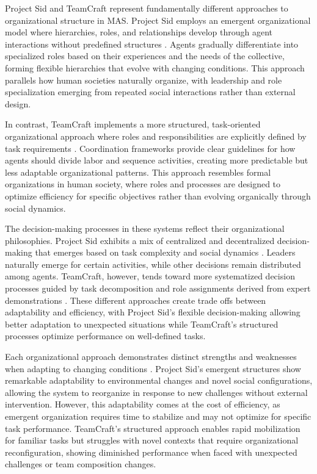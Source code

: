 \documentclass[a4paper, 12pt]{article}
\begin{document}
Project Sid and TeamCraft represent fundamentally different approaches to organizational structure in MAS. Project Sid employs an emergent organizational model where hierarchies, roles, and relationships develop through agent interactions without predefined structures \autocite{al2024projectsidmanyagentsimulations}. Agents gradually differentiate into specialized roles based on their experiences and the needs of the collective, forming flexible hierarchies that evolve with changing conditions. This approach parallels how human societies naturally organize, with leadership and role specialization emerging from repeated social interactions rather than external design.

In contrast, TeamCraft implements a more structured, task-oriented organizational approach where roles and responsibilities are explicitly defined by task requirements \autocite{long2024teamcraftbenchmarkmultimodalmultiagent}. Coordination frameworks provide clear guidelines for how agents should divide labor and sequence activities, creating more predictable but less adaptable organizational patterns. This approach resembles formal organizations in human society, where roles and processes are designed to optimize efficiency for specific objectives rather than evolving organically through social dynamics.

The decision-making processes in these systems reflect their organizational philosophies. Project Sid exhibits a mix of centralized and decentralized decision-making that emerges based on task complexity and social dynamics \autocite{al2024projectsidmanyagentsimulations}. Leaders naturally emerge for certain activities, while other decisions remain distributed among agents. TeamCraft, however, tends toward more systematized decision processes guided by task decomposition and role assignments derived from expert demonstrations \autocite{long2024teamcraftbenchmarkmultimodalmultiagent}. These different approaches create trade offs between adaptability and efficiency, with Project Sid's flexible decision-making allowing better adaptation to unexpected situations while TeamCraft's structured processes optimize performance on well-defined tasks.

Each organizational approach demonstrates distinct strengths and weaknesses when adapting to changing conditions \autocite{al2024projectsidmanyagentsimulations,long2024teamcraftbenchmarkmultimodalmultiagent,chen2024sagentsselforganizingagentsopenended}. Project Sid's emergent structures show remarkable adaptability to environmental changes and novel social configurations, allowing the system to reorganize in response to new challenges without external intervention. However, this adaptability comes at the cost of efficiency, as emergent organization requires time to stabilize and may not optimize for specific task performance. TeamCraft's structured approach enables rapid mobilization for familiar tasks but struggles with novel contexts that require organizational reconfiguration, showing diminished performance when faced with unexpected challenges or team composition changes.
\end{document}
